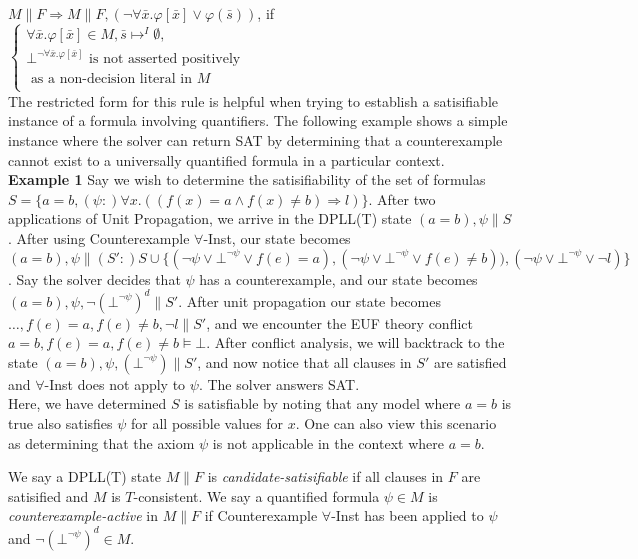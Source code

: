 \documentclass{llncs}
\begin{document}
$M \parallel F \Longrightarrow M \parallel F, (\neg \forall \bar{x}. \varphi[ \bar{ x } ] \vee \varphi( \bar{ s } ))$, if   
$\begin{cases}
  \forall \bar{x}. \varphi[ \bar{ x } ] \in M, \bar{ s } \mapsto^I \emptyset, \\
  \bot^{\neg \forall \bar{x}. \varphi[ \bar{ x } ]} \text{ is not asserted positively }\\
  \text{ \ \ \ as a non-decision literal in $M$ } \\    
\end{cases}$ \\

The restricted form for this rule is helpful when trying to establish a satisifiable instance of a formula involving quantifiers.
The following example shows a simple instance where the solver can return SAT by determining that a counterexample cannot exist to a universally quantified formula in a particular context. \\

{\bf Example 1}
Say we wish to determine the satisifiability of the set of formulas $S = \{ a = b, (\psi :) \forall x. ((f(x) = a \wedge f(x) \neq b) \Rightarrow l) \}$.
After two applications of Unit Propagation, we arrive in the DPLL(T) state $( a = b ), \psi \parallel S$.
After using Counterexample $\forall$-Inst, our state becomes $( a = b ), \psi \parallel (S':) S \cup \{ (\neg \psi \vee \bot^{\neg \psi} \vee f( e ) = a), (\neg \psi \vee \bot^{\neg \psi} \vee f( e ) \neq b)), (\neg \psi \vee \bot^{\neg \psi} \vee \neg l) \}$.
Say the solver decides that $\psi$ has a counterexample, and our state becomes $( a = b ), \psi, \neg (\bot^{\neg \psi})^d \parallel S'$. 
After unit propagation our state becomes $\ldots, f( e ) = a, f( e ) \neq b, \neg l \parallel S'$, and we encounter the EUF theory conflict $a = b, f( e ) = a, f( e ) \neq b \models \bot$.
After conflict analysis, we will backtrack to the state $( a = b ), \psi, (\bot^{\neg \psi}) \parallel S'$, and now notice that all clauses in $S'$ are satisfied and $\forall$-Inst does not apply to $\psi$.
The solver answers SAT. \\

Here, we have determined $S$ is satisfiable by noting that any model where $a = b$ is true also satisfies $\psi$ for all possible values for $x$.
One can also view this scenario as determining that the axiom $\psi$ is not applicable in the context where $a = b$.

We say a DPLL(T) state $M \parallel F$ is \emph{candidate-satisifiable} if all clauses in $F$ are satisified and $M$ is $T$-consistent.
We say a quantified formula $\psi \in M$ is \emph{counterexample-active} in $M \parallel F$ if Counterexample $\forall$-Inst has been applied to $\psi$ and $\neg (\bot^{\neg \psi})^d \in M$.
\end{document}

